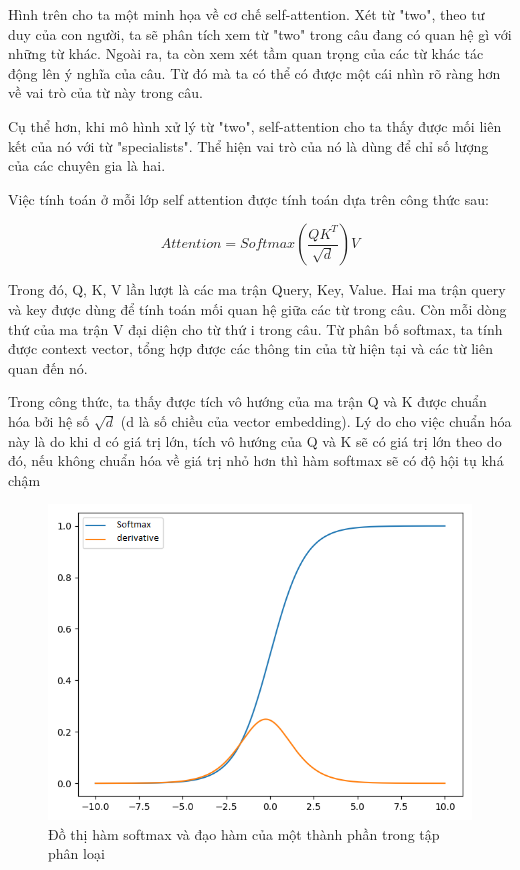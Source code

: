 Hình trên cho ta một minh họa về cơ chế self-attention. Xét từ "two", theo tư duy của con người, ta sẽ phân tích xem từ "two" trong câu đang có quan hệ gì với những từ khác. Ngoài ra, ta còn xem xét tầm quan trọng của các từ khác tác động lên ý nghĩa của câu. Từ đó mà ta có thể có được một cái nhìn rõ ràng hơn về vai trò của từ này trong câu.

Cụ thể hơn, khi mô hình xử lý từ "two", self-attention cho ta thấy được mối liên kết của nó với từ "specialists". Thể hiện vai trò của nó là dùng để chỉ số lượng của các chuyên gia là hai.

Việc tính toán ở mỗi lớp self attention được tính toán dựa trên công thức sau:

\begin{equation*}
	Attention = Softmax(\frac{QK^T}{\sqrt{d}})V
\end{equation*}

Trong đó, Q, K, V lần lượt là các ma trận Query, Key, Value. Hai ma trận query và key được dùng để tính toán mối quan hệ giữa các từ trong câu. Còn mỗi dòng thứ của ma trận V đại diện cho từ thứ i trong câu. Từ phân bố softmax, ta tính được context vector, tổng hợp được các thông tin của từ hiện tại và các từ liên quan đến nó. 

Trong công thức, ta thấy được tích vô hướng của ma trận Q và K được chuẩn hóa bởi hệ số $\sqrt{d}$ (d là số chiều của vector embedding). Lý do cho việc chuẩn hóa này là do khi d có giá trị lớn, tích vô hướng của Q và K sẽ có giá trị lớn theo do đó, nếu không chuẩn hóa về giá trị nhỏ hơn thì hàm softmax sẽ có độ hội tụ khá chậm

\begin{figure}[H]
    \begin{center}
        \includegraphics[scale=0.7]{images/softmax-func}
        \caption{Đồ thị hàm softmax và đạo hàm của một thành phần trong tập phân loại}
        \label{fig:softmax-func}
    \end{center}
\end{figure}


